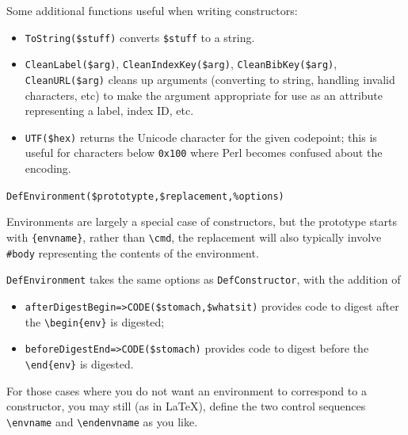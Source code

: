 \documentclass{book}
\begin{document}
Some additional functions useful when writing constructors:
\begin{itemize}
\item \verb|ToString($stuff)| converts \verb|$stuff| to a string.
\item \raggedright \verb|CleanLabel($arg)|,
   \verb|CleanIndexKey($arg)|,
   \verb|CleanBibKey($arg)|,
   \verb|CleanURL($arg)|
  cleans up arguments (converting to string, handling invalid characters, etc)
  to make the argument appropriate for use as an attribute representing
  a label, index ID, etc.
\item \verb|UTF($hex)| returns the Unicode character for the given
codepoint; this is useful for characters below \texttt{0x100} where
Perl becomes confused about the encoding.
\end{itemize}

\par\noindent \verb|DefEnvironment($prototypte,$replacement,%options)|
\par Environments are largely a special case of constructors,
but the prototype starts with \verb|{envname}|, rather than \verb|\cmd|,
the replacement will also typically involve \verb|#body| representing
the contents of the environment.

\texttt{DefEnvironment} takes the same options as  \texttt{DefConstructor},
with the addition of
\begin{itemize}
\item \verb|afterDigestBegin=>CODE($stomach,$whatsit)|
provides code to digest after the \verb|\begin{env}| is digested;
\item \verb|beforeDigestEnd=>CODE($stomach)|
provides code to digest before the \verb|\end{env}| is digested.
\end{itemize}

For those cases where you do not want an environment to correspond
to a constructor, you may still (as in \LaTeX), define the
two control sequences \verb|\envname| and \verb|\endenvname|
as you like.
\end{document}
